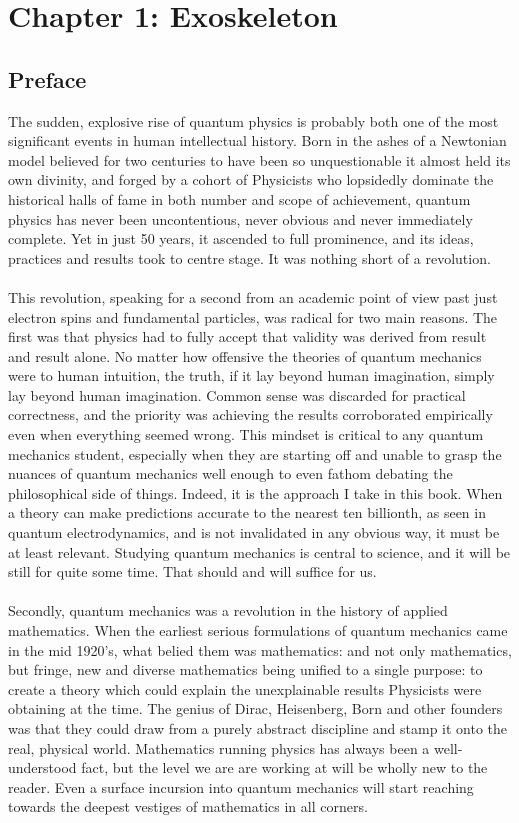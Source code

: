 \chapter{Chapter 1: Exoskeleton}
\section{Preface}
The sudden, explosive rise of quantum physics is probably both one of the most significant events in human intellectual history. Born in the ashes of a Newtonian model believed for two centuries to have been so unquestionable it almost held its own divinity, and forged by a cohort of Physicists who lopsidedly dominate the historical halls of fame in both number and scope of achievement, quantum physics has never been uncontentious, never obvious and never immediately complete. Yet in just 50 years, it ascended to full prominence, and its ideas, practices and results took to centre stage. It was nothing short of a revolution.
\\\\
This revolution, speaking for a second from an academic point of view past just electron spins and fundamental particles, was radical for two main reasons. The first was that physics had to fully accept that validity was derived from result and result alone. No matter how offensive the theories of quantum mechanics were to human intuition, the truth, if it lay beyond human imagination, simply lay beyond human imagination. Common sense was discarded for practical correctness, and the priority was achieving the results corroborated empirically even when everything seemed wrong. This mindset is critical to any quantum mechanics student, especially when they are starting off and unable to grasp the nuances of quantum mechanics well enough to even fathom debating the philosophical side of things. Indeed, it is the approach I take in this book. When a theory can make predictions accurate to the nearest ten billionth, as seen in quantum electrodynamics, and is not invalidated in any obvious way, it must be at least relevant. Studying quantum mechanics is central to science, and it will be still for quite some time. That should and will suffice for us.
\\\\
Secondly, quantum mechanics was a revolution in the history of applied mathematics. When the earliest serious formulations of quantum mechanics came in the mid 1920's, what belied them was mathematics: and not only mathematics, but fringe, new and diverse mathematics being unified to a single purpose: to create a theory which could explain the unexplainable results Physicists were obtaining at the time. The genius of Dirac, Heisenberg, Born and other founders was that they could draw from a purely abstract discipline and stamp it onto the real, physical world. Mathematics running physics has always been a well-understood fact, but the level we are are working at will be wholly new to the reader. Even a surface incursion into quantum mechanics will start reaching towards the deepest vestiges of mathematics in all corners.
